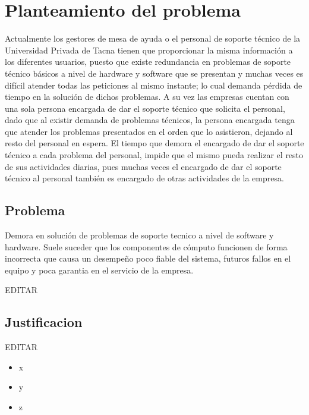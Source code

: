\documentclass[preprint,12pt]{elsarticle}
\begin{document}
\section{Planteamiento del problema}
Actualmente los gestores de mesa de ayuda o el personal de soporte técnico de la Universidad Privada de Tacna tienen que proporcionar la misma información a los diferentes usuarios, puesto que existe redundancia en problemas de soporte técnico básicos a nivel de hardware y software que se presentan y muchas veces es difícil atender todas las peticiones al mismo instante; lo cual demanda pérdida de tiempo en la solución de dichos problemas. A su vez las empresas  cuentan con una sola persona encargada de dar el soporte técnico que solicita el personal, dado que al existir demanda de problemas técnicos, la persona encargada tenga que atender los problemas presentados en el orden que lo asistieron, dejando al resto del personal en espera. El tiempo que demora el encargado de dar el soporte técnico a cada problema del personal, impide que el mismo pueda realizar el resto de sus actividades diarias, pues muchas veces el encargado de dar el soporte técnico al personal también es encargado de otras actividades de la empresa. 


\subsection {\textbf{Problema}}
Demora en solución de problemas de soporte tecnico a nivel de software y hardware. Suele suceder que los componentes de cómputo funcionen de forma incorrecta que causa un desempeño poco fiable del sistema, futuros fallos en el equipo y poca garantia en el servicio de la empresa.

EDITAR\\


\subsection {\textbf{Justificacion}}

EDITAR\\

\cite{Gartner} 

\begin{itemize}
	\item x
	\item y
	\item z
\end{itemize}
\end{document}
